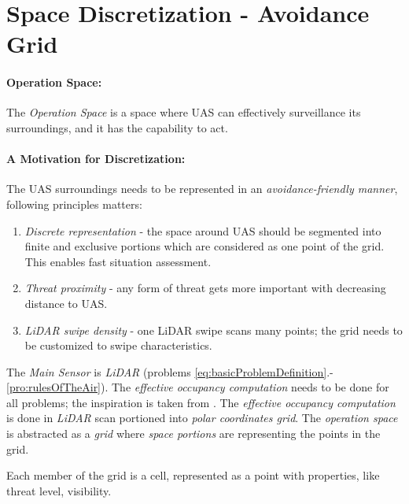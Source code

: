 \cleardoublepage
\section{Space Discretization - Avoidance Grid}\label{s:AvoidanceGrid}

\paragraph{Operation Space:} The \emph{Operation Space} is a space where UAS can effectively surveillance its surroundings, and it has the capability to act.

\paragraph{A Motivation for Discretization:} The UAS surroundings needs to be represented in an \emph{avoidance-friendly manner}, following principles matters:

\begin{enumerate}
	\item \emph{Discrete representation} - the space around UAS should be segmented into finite and exclusive portions which are considered as one point of the grid. This enables fast situation assessment. 
	
	\item \emph{Threat proximity} - any form of threat gets more important with decreasing distance to UAS.
	
	\item \emph{LiDAR swipe density} - one LiDAR swipe scans many points; the grid needs to be customized to swipe characteristics.
\end{enumerate}


The \emph{Main Sensor} is \emph{LiDAR} (problems \ref{eq:basicProblemDefinition}.-\ref{pro:rulesOfTheAir}).  The \emph{effective occupancy computation} needs to be done for all problems; the inspiration is taken from \cite{homm2010efficient}.  The \emph{effective occupancy computation} is done in \emph{LiDAR} scan  portioned into \emph{polar coordinates grid}. The \emph{operation space} is abstracted as a \emph{grid} where \emph{space portions} are representing the points in the grid.

\begin{note}
	Each member of the grid is a cell, represented as a point with properties, like threat level, visibility.
\end{note}

